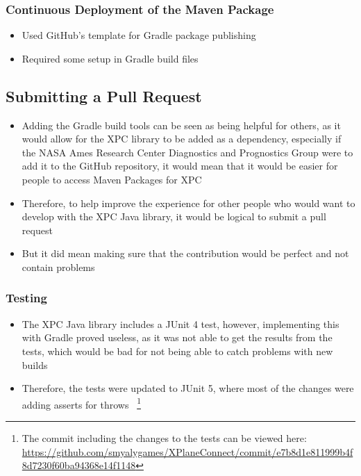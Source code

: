 \documentclass[../dissertation.tex]{subfiles}
\begin{document}
\subsubsection{Continuous Deployment of the Maven Package}
\begin{itemize}
  \item Used GitHub's template for Gradle package publishing
  \item Required some setup in Gradle build files
\end{itemize}

\subsection{Submitting a Pull Request}
\begin{itemize}
  \item Adding the Gradle build tools can be seen as being helpful
    for others, as it would allow for the XPC library to be added
    as a dependency, especially if the NASA Ames Research Center Diagnostics and Prognostics Group
    were to add it to the GitHub repository, it would mean that it would be easier for
    people to access Maven Packages for XPC
  \item Therefore, to help improve the experience for other people who would want
    to develop with the XPC Java library, it would be logical to submit a
    pull request
  \item But it did mean making sure that the contribution would be perfect and not contain problems %
\end{itemize}

\subsubsection{Testing}
\begin{itemize}
  \item The XPC Java library includes a JUnit 4 test, however, implementing this
    with Gradle proved useless, as it was not able to get the results from the
    tests, which would be bad for not being able to catch problems with new builds
  \item Therefore, the tests were updated to JUnit 5, where most of the changes were
    adding asserts for throws~\cite{junit:migrate}
    \footnote{The commit including the changes to the tests can be viewed here:
    \url{https://github.com/smyalygames/XPlaneConnect/commit/e7b8d1e811999b4f8d7230f60ba94368e14f1148}}
\end{itemize}
\end{document}
